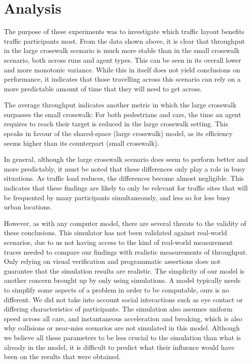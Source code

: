 \chapter{Analysis} \label{chap:analysis}

The purpose of these experiments was to investigate which traffic layout benefits traffic participants most. From the data shown above, it is clear that throughput in the large crosswalk scenario is much more stable than in the small crosswalk scenario, both across runs and agent types. This can be seen in its overall lower and more monotonic variance. While this in itself does not yield conclusions on performance, it indicates that those travelling across this scenario can rely on a more predictable amount of time that they will need to get across.

The average throughput indicates another metric in which the large crosswalk surpasses the small crosswalk: For both pedestrians and cars, the time an agent requires to reach their target is reduced in the large crosswalk setting. This speaks in favour of the shared-space (large crosswalk) model, as its efficiency seems higher than its counterpart (small crosswalk).

In general, although the large crosswalk scenario does seem to perform better and more predictably, it must be noted that these differences only play a role in busy situations. As traffic load reduces, the differences become almost negligible. This indicates that these findings are likely to only be relevant for traffic sites that will be frequented by many participants simultaneously, and less so for less busy urban locations.

However, as with any computer model, there are several threats to the validity of these conclusions. This simulator has not been validated against real-world scenarios, due to us not having access to the kind of real-world measurement traces needed to compare our findings with realistic measurements of throughput. Only relying on visual verification and programmatic assertions does not guarantee that the simulation results are realistic. The simplicity of our model is another concern brought up by only using simulations. A model typically needs to simplify some aspects of a problem in order to be computable, ours is no different. We did not take into account social interactions such as eye contact or differing characteristics of participants. The simulation also assumes uniform speed across all cars, and instantaneous acceleration and breaking, which is also why collisions or near-miss scenarios are not simulated in this model. Although we believe all these parameters to be less crucial to the simulation than what is already in the model, it is difficult to predict what their influence would have been on the results that were obtained.

